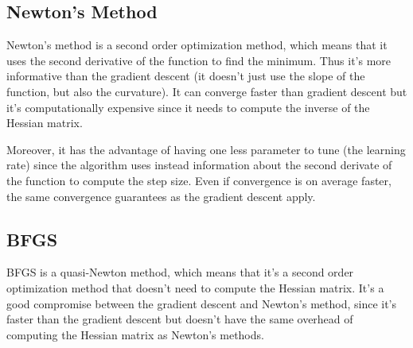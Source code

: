\subsection{Newton's Method}
\label{sec:newtons-method}
Newton's method is a second order optimization method, which means that it uses the second derivative of the function to find the minimum. Thus it's more informative than the gradient descent (it doesn't just use the slope of the function, but also the curvature). It can converge faster than gradient descent but it's computationally expensive since it needs to compute the inverse of the Hessian matrix.

Moreover, it has the advantage of having one less parameter to tune (the learning rate) since the algorithm uses instead information about the second derivate of the function to compute the step size.
Even if convergence is on average faster, the same convergence guarantees as the gradient descent apply.


\subsection{BFGS}
\label{sec:bfgs}
BFGS is a quasi-Newton method, which means that it's a second order optimization method that doesn't need to compute the Hessian matrix. It's a good compromise between the gradient descent and Newton's method, since it's faster than the gradient descent but doesn't have the same overhead of computing the Hessian matrix as Newton's methods.

